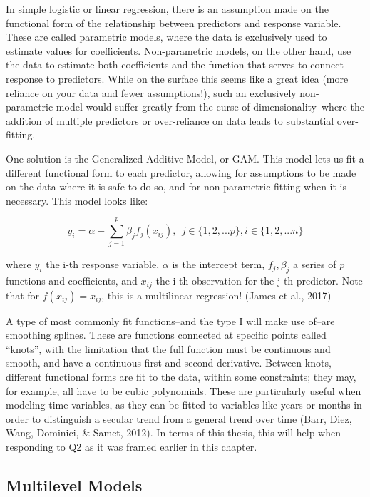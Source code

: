 \documentclass[12pt,twoside]{reedthesis}
\begin{document}
  In simple logistic or linear regression, there is an assumption made on
  the functional form of the relationship between predictors and response
  variable. These are called parametric models, where the data is
  exclusively used to estimate values for coefficients. Non-parametric
  models, on the other hand, use the data to estimate both coefficients
  and the function that serves to connect response to predictors. While on
  the surface this seems like a great idea (more reliance on your data and
  fewer assumptions!), such an exclusively non-parametric model would
  suffer greatly from the curse of dimensionality--where the addition of
  multiple predictors or over-reliance on data leads to substantial
  over-fitting.
  
  One solution is the Generalized Additive Model, or GAM. This model lets
  us fit a different functional form to each predictor, allowing for
  assumptions to be made on the data where it is safe to do so, and for
  non-parametric fitting when it is necessary. This model looks like:
  
  \[y_i = \alpha + \sum_{j = 1}^p \beta_j f_j(x_{ij}), ~~j \in \{1,2,...p\}, i \in \{1,2,...n\} \]
  
  where \(y_i\) the i-th response variable, \(\alpha\) is the intercept
  term, \(f_j, \beta_j\) a series of \(p\) functions and coefficients, and
  \(x_{ij}\) the i-th observation for the j-th predictor. Note that for
  \(f(x_{ij}) = x_{ij}\), this is a multilinear regression! (James et al.,
  2017)
  
  A type of most commonly fit functions--and the type I will make use
  of--are smoothing splines. These are functions connected at specific
  points called ``knots'', with the limitation that the full function must
  be continuous and smooth, and have a continuous first and second
  derivative. Between knots, different functional forms are fit to the
  data, within some constraints; they may, for example, all have to be
  cubic polynomials. These are particularly useful when modeling time
  variables, as they can be fitted to variables like years or months in
  order to distinguish a secular trend from a general trend over time
  (Barr, Diez, Wang, Dominici, \& Samet, 2012). In terms of this thesis,
  this will help when responding to Q2 as it was framed earlier in this
  chapter.
  
  \subsection{Multilevel Models}\label{multilevel-models}
  
\end{document}

